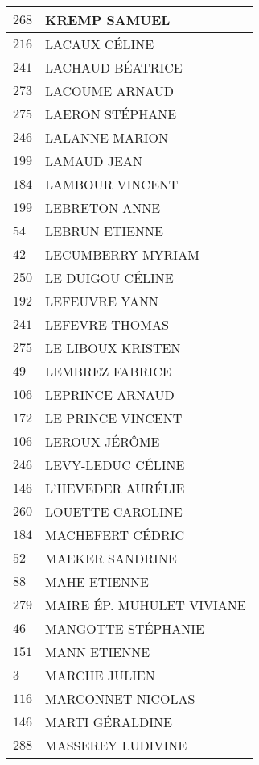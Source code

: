 \begin{xltabular}{\linewidth}{|l|X|}
    \hline
    $268$ & KREMP SAMUEL \\
    \hline
    $216$ & LACAUX CÉLINE \\
    \hline
    $241$ & LACHAUD BÉATRICE \\
    \hline
    $273$ & LACOUME ARNAUD \\
    \hline
    $275$ & LAERON STÉPHANE \\
    \hline
    $246$ & LALANNE MARION \\
    \hline
    $199$ & LAMAUD JEAN \\
    \hline
    $184$ & LAMBOUR VINCENT \\
    \hline
    $199$ & LEBRETON ANNE \\
    \hline
    $54$ & LEBRUN ETIENNE \\
    \hline
    $42$ & LECUMBERRY MYRIAM \\
    \hline
    $250$ & LE DUIGOU CÉLINE \\
    \hline
    $192$ & LEFEUVRE YANN \\
    \hline
    $241$ & LEFEVRE THOMAS \\
    \hline
    $275$ & LE LIBOUX KRISTEN \\
    \hline
    $49$ & LEMBREZ FABRICE \\
    \hline
    $106$ & LEPRINCE ARNAUD \\
    \hline
    $172$ & LE PRINCE VINCENT \\
    \hline
    $106$ & LEROUX JÉRÔME \\
    \hline
    $246$ & LEVY-LEDUC CÉLINE \\
    \hline
    $146$ & L'HEVEDER AURÉLIE \\
    \hline
    $260$ & LOUETTE CAROLINE \\
    \hline
    $184$ & MACHEFERT CÉDRIC \\
    \hline
    $52$ & MAEKER SANDRINE \\
    \hline
    $88$ & MAHE ETIENNE \\
    \hline
    $279$ & MAIRE ÉP. MUHULET VIVIANE \\
    \hline
    $46$ & MANGOTTE STÉPHANIE \\
    \hline
    $151$ & MANN ETIENNE \\
    \hline
    $3$ & MARCHE JULIEN \\
    \hline
    $116$ & MARCONNET NICOLAS \\
    \hline
    $146$ & MARTI GÉRALDINE \\
    \hline
    $288$ & MASSEREY LUDIVINE \\

\end{xltabular}
